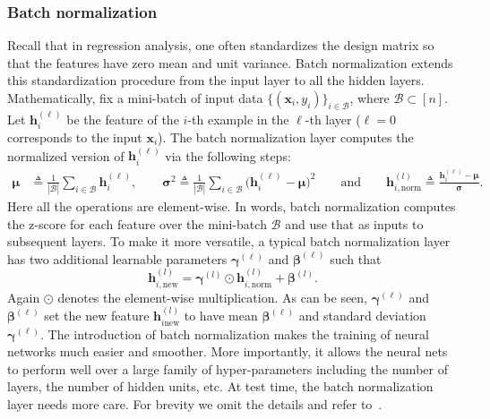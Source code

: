 \subsubsection{Batch normalization}

Recall that in regression analysis, one often standardizes the design matrix so that the features have zero mean and unit variance. Batch normalization extends this standardization procedure from the input layer to all the hidden layers. Mathematically, fix a mini-batch of input data $\{(\bm{x}_{i},y_{i})\}_{i\in \mathcal{B}}$, where $\mathcal{B} \subset [n]$. Let $\bm{h}_{i}^{(\ell)}$ be the feature of the $i$-th example in the $\ell$-th layer ($\ell=0$ corresponds to the input $\bm{x}_{i}$). The batch normalization layer computes the normalized version of $\bm{h}_{i}^{(\ell)}$ via the following steps:
\begin{align*}
\bm{\mu} & \triangleq \frac{1}{\left|\mathcal{B}\right|}\sum_{i\in \mathcal{B}}\bm{h}_{i}^{(\ell)},\qquad \bm{\sigma}^{2}  \triangleq\frac{1}{\left|\mathcal{B}\right|}\sum_{i\in \mathcal{B}}\big(\bm{h}_{i}^{(\ell)}-\bm{\mu}\big)^{2} \qquad\text{and}\qquad \bm{h}_{i,\text{norm}}^{(l)}  \triangleq\frac{\bm{h}_{i}^{(\ell)}-\bm{\mu}}{\bm{\sigma}}.
\end{align*}
Here all the operations are element-wise. In words, batch normalization computes the z-score for each feature over the mini-batch $\mathcal{B}$ and use that as inputs to subsequent layers. To make it more versatile, a typical batch normalization layer has two additional learnable parameters $\bm{\gamma}^{(\ell)}$ and $\bm{\beta}^{(\ell)}$ such that
\[
\bm{h}_{i,\text{new}}^{(l)}=\bm{\gamma}^{(l)}\odot\bm{h}_{i,\text{norm}}^{(l)}+\bm{\beta}^{(l)}.
\]
Again $\odot$ denotes the element-wise multiplication. As can be seen, $\bm{\gamma}^{(\ell)}$ and $\bm{\beta}^{(\ell)}$ set the new feature $\bm{h}_{i \text{new}}^{(l)}$ to have mean $\bm{\beta}^{(\ell)}$ and standard deviation $\bm{\gamma}^{(\ell)}$. The introduction of batch normalization makes the training of neural networks much easier and smoother. More importantly, it allows the neural nets to perform well over a large family of hyper-parameters including the number of layers, the number of hidden units, etc. At test time, the batch normalization layer needs more care. For brevity we omit the details and refer to~\cite{ioffe2015batch}.


